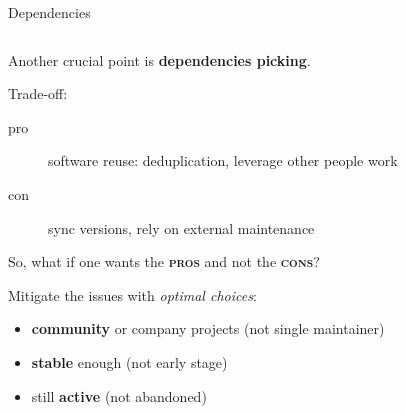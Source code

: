 \documentclass[9pt]{beamer}
\begin{document}
\begin{frame}{Dependencies}
    \begin{columns}
        \begin{column}{0.5\textwidth}
            Another crucial point is \textbf{dependencies picking}.
            \vspace*{10pt}

            Trade-off:
            \begin{description}
                \item[pro] software reuse: deduplication, leverage other people work
                \item[con] sync versions, rely on external maintenance
            \end{description}
            \vspace*{20pt}

            So, what if one wants the \textbf{\textsc{pros}} and not the
            \textbf{\textsc{cons}}?

            Mitigate the issues with \textit{optimal choices}:
            \begin{itemize}
                \item \alert{\textbf{community}} or company projects (not
                  single maintainer)
                \item \alert{\textbf{stable}} enough (not early stage)
                \item still \alert{\textbf{active}} (not abandoned)
            \end{itemize}
            \vspace*{10pt}


\end{column}
\end{columns}
\end{frame}
\end{document}
